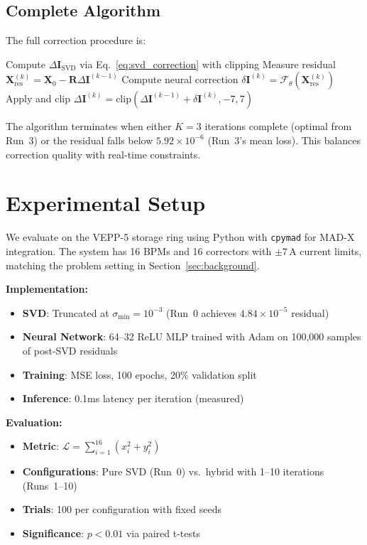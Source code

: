 \documentclass{article} %
\begin{document}
\subsection{Complete Algorithm}
The full correction procedure is:

\begin{algorithm}[t]
\caption{Hybrid Correction}
\label{alg:hybrid}
\begin{algorithmic}[1]
\State Compute $\Delta\mathbf{I}_{\text{SVD}}$ via Eq.~\ref{eq:svd_correction} with clipping
    \State Measure residual $\mathbf{X}_{\text{res}}^{(k)} = \mathbf{X}_0 - \mathbf{R}\Delta\mathbf{I}^{(k-1)}$
    \State Compute neural correction $\delta\mathbf{I}^{(k)} = \mathcal{F}_\theta(\mathbf{X}_{\text{res}}^{(k)})$
    \State Apply and clip $\Delta\mathbf{I}^{(k)} = \text{clip}(\Delta\mathbf{I}^{(k-1)} + \delta\mathbf{I}^{(k)}, -7, 7)$
\EndFor
\end{algorithmic}
\end{algorithm}

The algorithm terminates when either $K=3$ iterations complete (optimal from Run~3) or the residual falls below $5.92 \times 10^{-6}$ (Run~3's mean loss). This balances correction quality with real-time constraints.

\section{Experimental Setup}
\label{sec:experimental}

We evaluate on the VEPP-5 storage ring using Python with \texttt{cpymad} for MAD-X integration. The system has 16 BPMs and 16 correctors with $\pm7$\,A current limits, matching the problem setting in Section~\ref{sec:background}.

\textbf{Implementation:}
\begin{itemize}
    \item \textbf{SVD}: Truncated at $\sigma_{\min}=10^{-3}$ (Run~0 achieves $4.84 \times 10^{-5}$ residual)
    \item \textbf{Neural Network}: 64--32 ReLU MLP trained with Adam on 100,000 samples of post-SVD residuals
    \item \textbf{Training}: MSE loss, 100 epochs, 20\% validation split
    \item \textbf{Inference}: 0.1ms latency per iteration (measured)
\end{itemize}

\textbf{Evaluation:}
\begin{itemize}
    \item \textbf{Metric}: $\mathcal{L} = \sum_{i=1}^{16} (x_i^2 + y_i^2)$
    \item \textbf{Configurations}: Pure SVD (Run~0) vs.\ hybrid with 1--10 iterations (Runs~1--10)
    \item \textbf{Trials}: 100 per configuration with fixed seeds
    \item \textbf{Significance}: $p<0.01$ via paired t-tests
\end{itemize}
\end{document}
